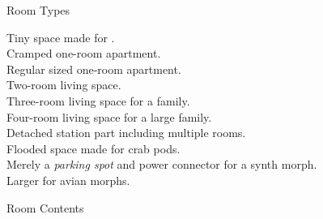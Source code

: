 \documentclass[a4]{article}
\begin{document}
Room Types

\starttableone
Tiny space made for .\\
Cramped one-room apartment.\\
Regular sized one-room apartment.\\
Two-room living space.\\
Three-room living space for a family.\\
Four-room living space for a large family.\\
Detached station part including multiple rooms.\\
Flooded space made for crab pods.\\
Merely a \textit{parking spot} and power connector for a synth morph.\\
Larger  for avian morphs.\\
\stoptableone


Room Contents
\end{document}
